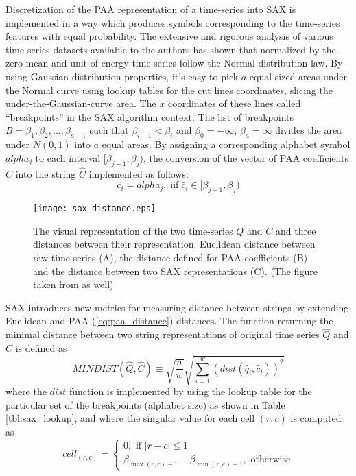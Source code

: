Discretization of the PAA representation of a time-series into SAX is implemented in a way which produces symbols corresponding to the time-series features with equal probability. The extensive and rigorous analysis of various time-series datasets available to the authors has shown that normalized by the zero mean and unit of energy time-series follow the Normal distribution law. By using Gaussian distribution properties, it's easy to pick $a$ equal-sized areas under the Normal curve using  lookup tables  \cite{citeulike:4434481} for the cut lines coordinates, slicing the under-the-Gaussian-curve area. 
The $x$ coordinates of these lines called ``breakpoints'' in the SAX algorithm context. The list of breakpoints $B=\beta_{1}, \beta_{2}, ... , \beta_{a-1}$ such that $\beta_{i-1} < \beta_{i}$ and $\beta_{0} = -\infty$, $\beta_{a} = \infty$ divides the area under $N(0,1)$ into $a$ equal areas. By assigning a corresponding alphabet symbol $alpha_{j}$ to each interval $[\beta_{j-1},\beta_{j})$, the conversion of the vector of PAA coefficients $\bar{C}$ into the string $\hat{C}$ implemented as follows:
\begin{equation}
\hat{c}_{i} = alpha_{j}, \; \text{iif} \; \bar{c}_{i} \in [\beta_{j-1},\beta_{j})
\label{eq:alpha}
\end{equation}

\begin{figure}[tbp]
   \centering
   \texttt{[image: sax\_distance.eps]}
   \caption{The visual representation of the two time-series $Q$ and $C$ and three distances between their representation: Euclidean distance between raw time-series (A), the distance defined for PAA coefficients (B) and the distance between two SAX representations (C). (The figure taken from \cite{citeulike:2821475} as well)}
   \label{fig:sax_distance}
\end{figure}

SAX introduces new metrics for measuring distance between strings by extending Euclidean and PAA (\ref{eq:paa_distance}) distances. The function returning the minimal distance between two string representations of original time series $\hat{Q}$ and $\hat{C}$ is defined as
\begin{equation}
MINDIST(\hat{Q},\hat{C}) \equiv \sqrt{ \frac{n}{w} } \sqrt{ \sum_{i=1}^{w} ( dist( \hat{q}_{i}, \hat{c}_{i} ) )^{2}}
\label{eq:sax_mindist}
\end{equation} 
where the $dist$ function is implemented by using the lookup table for the particular set of the breakpoints (alphabet size) as shown in Table \ref{tbl:sax_lookup}, and where the singular value for each cell $(r,c)$ is computed as 
\begin{equation}
cell_{(r,c)} = 
\begin{cases} 
0, \text{ if }\left| r-c \right| \leq 1 \\
\beta_{\max(r,c) - 1} - \beta_{\min(r,c) - 1}, \text{ otherwise}
\end{cases}
\label{eq:cell}
\end{equation}

